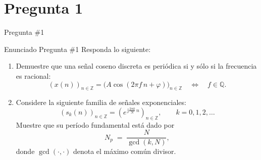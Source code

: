 \documentclass[
    10pt,
    aspectratio=169,
    xcolor={dvipsnames},
    spanish,
    ]{beamer}
\begin{document}
\section{Pregunta 1}
\begin{frame}{Pregunta \#1}
\begin{block}{Enunciado Pregunta \#1}
  \footnotesize
   Responda lo siguiente:
\begin{enumerate}

  \item Demuestre que una señal coseno discreta es periódica si y sólo si la frecuencia es racional:
  \begin{equation}
    (x(n))_{n\in\mathbb{Z}}
    =\bigl(A\cos(2\pi f\,n+\varphi)\bigr)_{n\in\mathbb{Z}}
    \quad\Longleftrightarrow\quad f\in\mathbb{Q}.
  \end{equation}

  \item Considere la siguiente familia de señales exponenciales:
  \begin{equation}
    (s_k(n))_{n\in\mathbb{Z}}
    =\left(e^{\,\mathrm{j}\frac{2\pi k}{N}\,n}\right)_{n\in\mathbb{Z}},
    \qquad k=0,1,2,\ldots
  \end{equation}
  Muestre que su período fundamental está dado por
  \begin{equation}
    N_p \;=\; \frac{N}{\gcd(k,N)},
  \end{equation}
  donde \(\gcd(\cdot,\cdot)\) denota el máximo común divisor.
\end{enumerate}
\end{block}
\end{frame}
\end{document}
